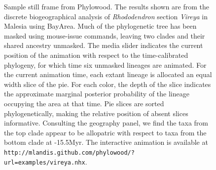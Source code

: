 \documentclass[11pt]{article}
\begin{document}
\begin{figure}
\begin{center}
{Sample still frame from Phylowood. The results shown are from the discrete biogeographical analysis of {\it Rhododendron} section {\it Vireya} in Malesia using BayArea. Much of the phylogenetic tree has been masked using mouse-issue commands, leaving two clades and their shared ancestry unmasked. The media slider indicates the current position of the animation with respect to the time-calibrated phylogeny, for which time six unmasked lineages are animated.  For the current animation time, each extant lineage is allocated an equal width slice of the pie. For each color, the depth of the slice indicates the approximate marginal posterior probability of the lineage occupying the area at that time. Pie slices are sorted phylogenetically, making the relative position of absent slices informative. Consulting the geography panel, we find the taxa from the top clade appear to be allopatric with respect to taxa from the bottom clade at -15.5Myr. The interactive animation is available at \texttt{http://mlandis.github.com/phylowood/?url=examples/vireya.nhx}.
}
\label{phylowood}
\end{center}
\end{figure}
\end{document}
